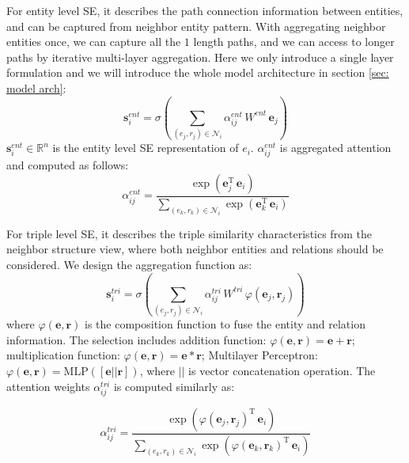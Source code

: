 \documentclass[letterpaper]{article} \usepackage{aaai22}  \usepackage{times}  \usepackage{helvet}  \usepackage{courier}  \usepackage[hyphens]{url}  \usepackage{graphicx} \urlstyle{rm} \def\UrlFont{\rm}  \usepackage{natbib}  \usepackage{caption} \DeclareCaptionStyle{ruled}{labelfont=normalfont,labelsep=colon,strut=off} \frenchspacing  \setlength{\pdfpagewidth}{8.5in}  \setlength{\pdfpageheight}{11in}  \usepackage{algorithm}
\begin{document}
For entity level SE, it describes the path connection information between entities, and can be captured from neighbor entity pattern. With aggregating neighbor entities once, we can capture all the $1$ length paths, and we can access to longer paths by iterative multi-layer aggregation. Here we only introduce a single layer formulation and we will introduce the whole model architecture in section \ref{sec: model arch}: 
\begin{equation}
    \mathbf{s}_i^{ent} = \sigma\left( \sum_{(e_j, r_j) \in \mathcal{N}_i} \alpha^{ent}_{ij} \, W^{ent} \, \mathbf{e}_j \right)
\end{equation}
$\mathbf{s}_i^{ent} \in \mathbb{R}^n$ is the entity level SE representation of $e_i$. $\alpha^{ent}_{ij}$ is aggregated attention and computed as follows: 
\begin{equation}
    \alpha_{ij}^{ent} = \frac{\exp \left( \mathbf{e}_j^{\mathrm{T}} \, \mathbf{e}_i \right)}{\sum_{(e_k, r_k) \in \mathcal{N}_i} \exp \left(\mathbf{e}_k^{\mathrm{T}} \, \mathbf{e}_i \right)}
\end{equation}

For triple level SE, it describes the triple similarity characteristics from the neighbor structure view, where both neighbor entities and relations should be considered. We design the aggregation function as: 
\begin{equation}
    \label{eq: triple_se_agg}
    \mathbf{s}_i^{tri} = \sigma\left( \sum_{(e_j, r_j) \in \mathcal{N}_i} \alpha^{tri}_{ij} \, W^{tri} \, \varphi(\mathbf{e}_j, \mathbf{r}_j) \right)
\end{equation}
where $\varphi(\mathbf{e}, \mathbf{r})$ is the composition function to fuse the entity and relation information. The selection includes addition function: $\varphi(\mathbf{e}, \mathbf{r}) = \mathbf{e} + \mathbf{r}$; multiplication function: $\varphi(\mathbf{e}, \mathbf{r}) = \mathbf{e} * \mathbf{r}$; Multilayer Perceptron: $\varphi(\mathbf{e}, \mathbf{r}) = \mathrm{MLP}([\mathbf{e} || \mathbf{r}])$, where $||$ is vector concatenation operation. The attention weights $\alpha^{tri}_{ij}$ is computed similarly as: 

\begin{equation}
    \label{eq: triple_se_attention}
    \alpha_{ij}^{tri} = \frac{\exp \left( \varphi(\mathbf{e}_j, \mathbf{r}_j)^{\mathrm{T}} \, \mathbf{e}_i \right)}{\sum_{(e_k, r_k) \in \mathcal{N}_i} \exp \left( \varphi(\mathbf{e}_k, \mathbf{r}_k)^{\mathrm{T}} \,  \mathbf{e}_i\right)}
\end{equation}
\end{document}
